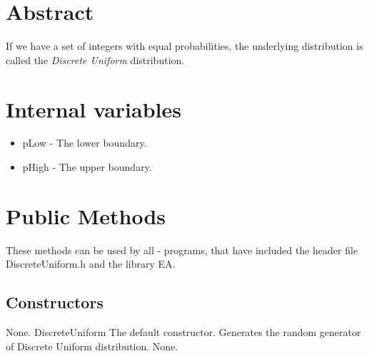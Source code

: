 %

\section{Abstract}

\noindent
If we have a set of integers with equal probabilities, the underlying
distribution is called the {\em Discrete Uniform} distribution.

\vspace*{10mm}

\section{Internal variables}

\begin{itemize}
\item {pLow - The lower boundary.}
\item {pHigh - The upper boundary.}
\end{itemize}


\vspace*{10mm}

\section{Public Methods}

\noindent
These methods can be used by all \cpp - programs, that have included the
header file DiscreteUniform.h and the library EA.

\subsection{Constructors}

\setNormalInstance
\setCorrectWidthThree{8pt}
\printMethodWithParamsSaved
{}
{None.}
{DiscreteUniform}
{The default constructor. Generates the random generator of Discrete
Uniform distribution.}
{None.}
\setCorrectWidthThree{4pt}


